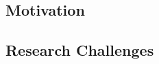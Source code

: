 \documentclass{beamer}
\begin{document}





\subsection{Motivation}
\label{sec:motivation}


\subsection{Research Challenges}


\end{document}

